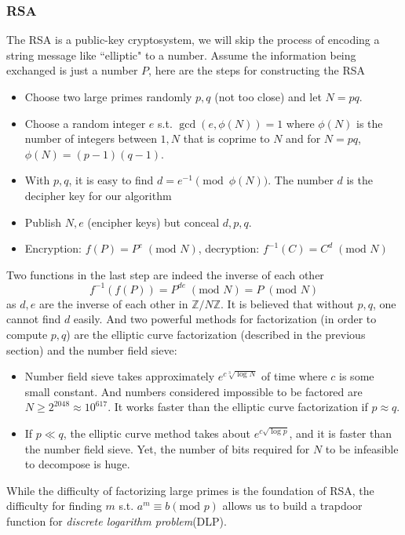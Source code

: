 \documentclass[12pt]{article}
\theoremstyle{remark}
\theoremstyle{definition}
\newcommand{\Z}[0]{\mathbb{Z}}
\begin{document}
    \subsubsection{RSA} 
    The RSA is a public-key cryptosystem, we will skip the process of encoding a string message like ``elliptic" to a number. Assume the information being exchanged is just a number $P$, here are the steps for constructing the RSA
    \begin{itemize}
        \item Choose two large primes randomly $p, q$ (not too close) and let $N = pq$. 
        \item Choose a random integer $e$ s.t. $\gcd(e, \phi(N)) = 1$ where $\phi(N)$ is the number of integers between $1, N$ that is coprime to $N$ and for $N = pq$, $\phi(N) = (p-1)(q-1)$. 
        \item With $p, q$, it is easy to find $d = e^{-1}\pmod{\phi(N)}$. The number $d$ is the decipher key for our algorithm
        \item Publish $N, e$ (encipher keys) but conceal $d, p, q$.
        \item Encryption: $f(P) = P^e \; (\text{mod } N)$, decryption: $f^{-1}(C) = C^d \; (\text{mod } N)$
    \end{itemize}
    Two functions in the last step are indeed the inverse of each other 
    $$f^{-1} (f(P)) = P^{de} \; (\text{mod } N) = P \; (\text{mod } N)$$
    as $d, e$ are the inverse of each other in $\Z/N\Z$. It is believed that without $p, q$, one cannot find $d$ easily. And two powerful methods for factorization (in order to compute $p, q$) are the elliptic curve factorization (described in the previous section) and the number field sieve: 
    \begin{itemize}
        \item Number field sieve takes approximately $e^{c \sqrt[3]{\log{N}}}$ of time where $c$ is some small constant. And numbers considered impossible to be factored are $N \geq 2^{2048} \approx 10^{617}$. It works faster than the elliptic curve factorization if $p \approx q$. 
        \item If $p \ll q$, the elliptic curve method takes about $e^{c\sqrt{\log{p}}}$, and it is faster than the number field sieve. Yet, the number of bits required for $N$ to be infeasible to decompose is huge. 
    \end{itemize}
    
    While the difficulty of factorizing large primes is the foundation of RSA, the difficulty for finding $m$ s.t. $a^m \equiv b (\text{mod } p)$ allows us to build a trapdoor function for \textit{discrete logarithm problem}(DLP).
    
\end{document}
